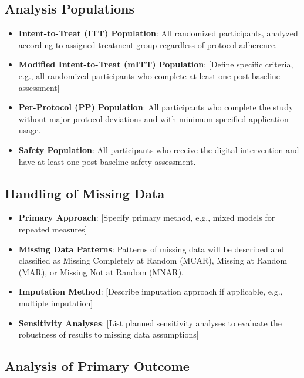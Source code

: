 \subsection{Analysis Populations}

\begin{itemize}
    \item \textbf{Intent-to-Treat (ITT) Population}: All randomized participants, analyzed according to assigned treatment group regardless of protocol adherence.
    
    \item \textbf{Modified Intent-to-Treat (mITT) Population}: [Define specific criteria, e.g., all randomized participants who complete at least one post-baseline assessment]
    
    \item \textbf{Per-Protocol (PP) Population}: All participants who complete the study without major protocol deviations and with minimum specified application usage.
    
    \item \textbf{Safety Population}: All participants who receive the digital intervention and have at least one post-baseline safety assessment.
\end{itemize}

\subsection{Handling of Missing Data}

\begin{itemize}
    \item \textbf{Primary Approach}: [Specify primary method, e.g., mixed models for repeated measures]
    
    \item \textbf{Missing Data Patterns}: Patterns of missing data will be described and classified as Missing Completely at Random (MCAR), Missing at Random (MAR), or Missing Not at Random (MNAR).
    
    \item \textbf{Imputation Method}: [Describe imputation approach if applicable, e.g., multiple imputation]
    
    \item \textbf{Sensitivity Analyses}: [List planned sensitivity analyses to evaluate the robustness of results to missing data assumptions]
\end{itemize}

\subsection{Analysis of Primary Outcome}

